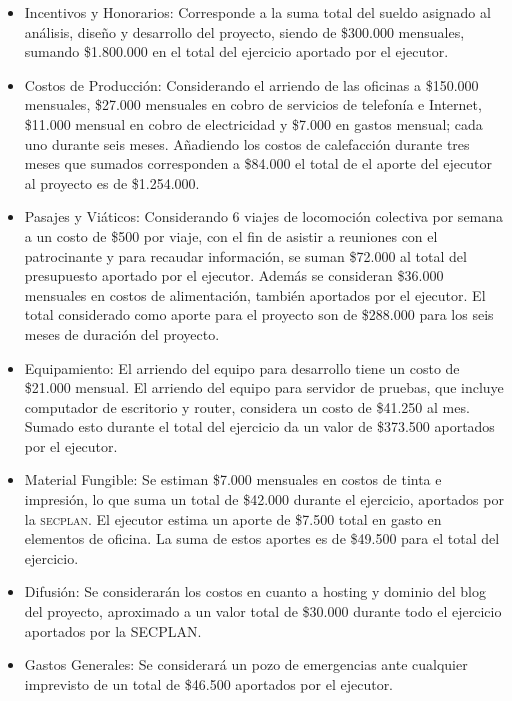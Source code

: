 \documentclass[12pt]{article}
\begin{document}
\begin{itemize}
    \item Incentivos y Honorarios: Corresponde a la suma total del sueldo
      asignado al análisis, diseño y desarrollo del proyecto, siendo de
      \$300.000 mensuales, sumando \$1.800.000 en el total del ejercicio
      aportado por el ejecutor.
    \item Costos de Producción: Considerando el arriendo de las oficinas a
      \$150.000 mensuales, \$27.000 mensuales en cobro de servicios de
      telefonía e Internet, \$11.000 mensual en cobro de electricidad y
      \$7.000 en gastos mensual; cada uno durante seis meses. Añadiendo los
      costos de calefacción durante tres meses que sumados corresponden a
      \$84.000 el total de el aporte del ejecutor al proyecto es de
      \$1.254.000.
    \item Pasajes y Viáticos: Considerando 6 viajes de locomoción colectiva por
      semana a un costo de \$500 por viaje, con el fin de asistir a reuniones
      con el patrocinante y para recaudar información, se suman \$72.000 al
      total del presupuesto aportado por el ejecutor. Además se consideran
      \$36.000 mensuales en costos de alimentación, también aportados por el
      ejecutor. El total considerado como aporte para el proyecto son de
      \$288.000 para los seis meses de duración del proyecto.
    \item Equipamiento: El arriendo del equipo para desarrollo tiene un costo de
      \$21.000 mensual. El arriendo del equipo para servidor de pruebas, que
      incluye computador de escritorio y router, considera un costo de
      \$41.250 al mes. Sumado esto durante el total del ejercicio da un valor
      de \$373.500 aportados por el ejecutor.
    \item Material Fungible: Se estiman \$7.000 mensuales en costos de tinta e
      impresión, lo que suma un total de \$42.000 durante el ejercicio,
      aportados por la \textsc{secplan}. El ejecutor estima un aporte de \$7.500 total en
      gasto en elementos de oficina. La suma de estos aportes es de \$49.500 para
      el total del ejercicio.
    \item Difusión: Se considerarán los costos en cuanto a hosting y dominio del
      blog del proyecto, aproximado a un valor total de \$30.000 durante todo
      el ejercicio aportados por la SECPLAN.
    \item Gastos Generales: Se considerará un pozo de emergencias ante cualquier
      imprevisto de un total de \$46.500 aportados por el ejecutor.
\end{itemize}
\newpage
\end{document}
